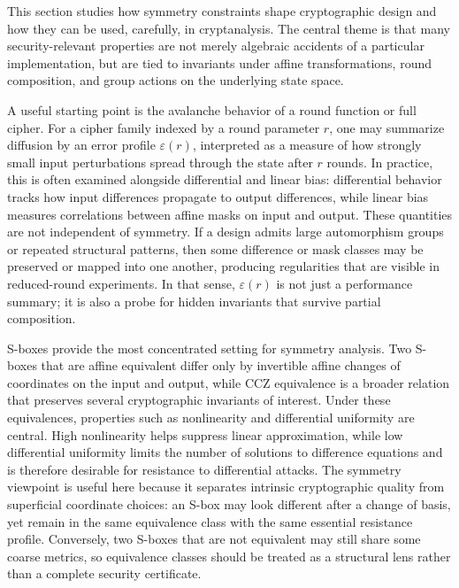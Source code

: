 This section studies how symmetry constraints shape cryptographic design and how they can be used, carefully, in cryptanalysis. The central theme is that many security-relevant properties are not merely algebraic accidents of a particular implementation, but are tied to invariants under affine transformations, round composition, and group actions on the underlying state space.

A useful starting point is the avalanche behavior of a round function or full cipher. For a cipher family indexed by a round parameter $r$, one may summarize diffusion by an error profile $\varepsilon(r)$, interpreted as a measure of how strongly small input perturbations spread through the state after $r$ rounds. In practice, this is often examined alongside differential and linear bias: differential behavior tracks how input differences propagate to output differences, while linear bias measures correlations between affine masks on input and output. These quantities are not independent of symmetry. If a design admits large automorphism groups or repeated structural patterns, then some difference or mask classes may be preserved or mapped into one another, producing regularities that are visible in reduced-round experiments. In that sense, $\varepsilon(r)$ is not just a performance summary; it is also a probe for hidden invariants that survive partial composition.

S-boxes provide the most concentrated setting for symmetry analysis. Two S-boxes that are affine equivalent differ only by invertible affine changes of coordinates on the input and output, while CCZ equivalence is a broader relation that preserves several cryptographic invariants of interest. Under these equivalences, properties such as nonlinearity and differential uniformity are central. High nonlinearity helps suppress linear approximation, while low differential uniformity limits the number of solutions to difference equations and is therefore desirable for resistance to differential attacks. The symmetry viewpoint is useful here because it separates intrinsic cryptographic quality from superficial coordinate choices: an S-box may look different after a change of basis, yet remain in the same equivalence class with the same essential resistance profile. Conversely, two S-boxes that are not equivalent may still share some coarse metrics, so equivalence classes should be treated as a structural lens rather than a complete security certificate.

